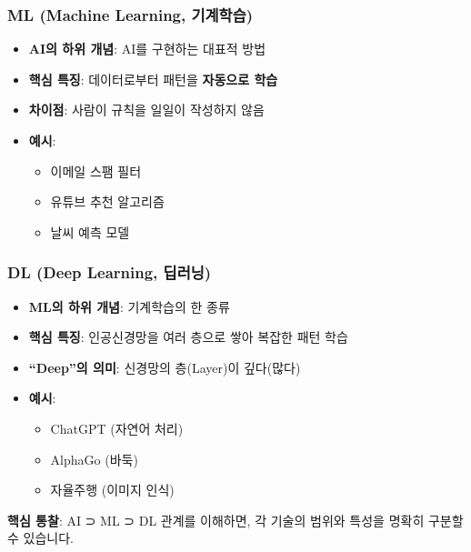 \documentclass[a4paper, 11pt]{article}
\providecommand{\tightlist}{%
  \setlength{\itemsep}{0pt}\setlength{\parskip}{0pt}}
\renewenvironment{quote}
  {\begin{tcolorbox}[colback=lightblue!30, colframe=mainblue!50,
   left=8pt, right=8pt, top=4pt, bottom=4pt, breakable]}
  {\end{tcolorbox}}
\begin{document}
\hypertarget{ml-machine-learning-uxae30uxacc4uxd559uxc2b5}{%
\subsubsection{ ML (Machine Learning,
기계학습)}\label{ml-machine-learning-uxae30uxacc4uxd559uxc2b5}}

\begin{itemize}
\tightlist
\item
  \textbf{AI의 하위 개념}: AI를 구현하는 대표적 방법
\item
  \textbf{핵심 특징}: 데이터로부터 패턴을 \textbf{자동으로 학습}
\item
  \textbf{차이점}: 사람이 규칙을 일일이 작성하지 않음
\item
  \textbf{예시}:

  \begin{itemize}
  \tightlist
  \item
    이메일 스팸 필터
  \item
    유튜브 추천 알고리즘
  \item
    날씨 예측 모델
  \end{itemize}
\end{itemize}

\hypertarget{dl-deep-learning-uxb525uxb7ecuxb2dd}{%
\subsubsection{ DL (Deep Learning,
딥러닝)}\label{dl-deep-learning-uxb525uxb7ecuxb2dd}}

\begin{itemize}
\tightlist
\item
  \textbf{ML의 하위 개념}: 기계학습의 한 종류
\item
  \textbf{핵심 특징}: 인공신경망을 여러 층으로 쌓아 복잡한 패턴 학습
\item
  \textbf{``Deep''의 의미}: 신경망의 층(Layer)이 깊다(많다)
\item
  \textbf{예시}:

  \begin{itemize}
  \tightlist
  \item
    ChatGPT (자연어 처리)
  \item
    AlphaGo (바둑)
  \item
    자율주행 (이미지 인식)
  \end{itemize}
\end{itemize}

\begin{quote}
 \textbf{핵심 통찰}: AI ⊃ ML ⊃ DL 관계를 이해하면, 각 기술의 범위와
특성을 명확히 구분할 수 있습니다.
\end{quote}
\end{document}
